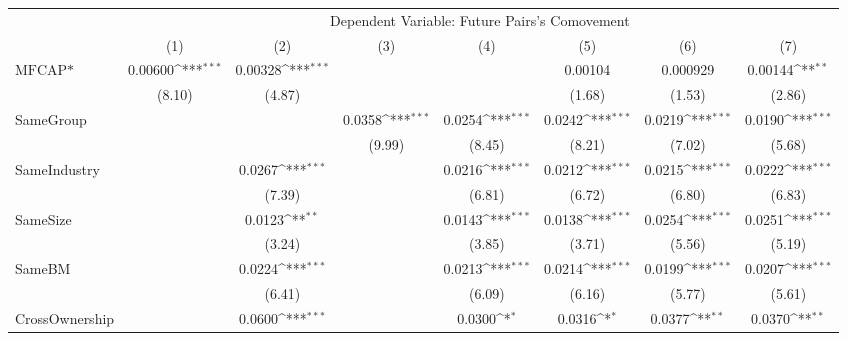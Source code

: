 {
\def\sym#1{\ifmmode^{#1}\else\(^{#1}\)\fi}
\begin{tabular}{l*{7}{c}}
\hline\hline
                &\multicolumn{7}{c}{Dependent Variable:  Future Pairs's Comovement}                                                                  \\\cmidrule(lr){2-8}
                &\multicolumn{1}{c}{(1)}         &\multicolumn{1}{c}{(2)}         &\multicolumn{1}{c}{(3)}         &\multicolumn{1}{c}{(4)}         &\multicolumn{1}{c}{(5)}         &\multicolumn{1}{c}{(6)}         &\multicolumn{1}{c}{(7)}         \\
\hline
$ \text{MFCAP*} $&  0.00600\sym{***}&  0.00328\sym{***}&                  &                  &  0.00104         & 0.000929         &  0.00144\sym{**} \\
                &   (8.10)         &   (4.87)         &                  &                  &   (1.68)         &   (1.53)         &   (2.86)         \\
[1em]
SameGroup       &                  &                  &   0.0358\sym{***}&   0.0254\sym{***}&   0.0242\sym{***}&   0.0219\sym{***}&   0.0190\sym{***}\\
                &                  &                  &   (9.99)         &   (8.45)         &   (8.21)         &   (7.02)         &   (5.68)         \\
[1em]
SameIndustry    &                  &   0.0267\sym{***}&                  &   0.0216\sym{***}&   0.0212\sym{***}&   0.0215\sym{***}&   0.0222\sym{***}\\
                &                  &   (7.39)         &                  &   (6.81)         &   (6.72)         &   (6.80)         &   (6.83)         \\
[1em]
SameSize        &                  &   0.0123\sym{**} &                  &   0.0143\sym{***}&   0.0138\sym{***}&   0.0254\sym{***}&   0.0251\sym{***}\\
                &                  &   (3.24)         &                  &   (3.85)         &   (3.71)         &   (5.56)         &   (5.19)         \\
[1em]
SameBM          &                  &   0.0224\sym{***}&                  &   0.0213\sym{***}&   0.0214\sym{***}&   0.0199\sym{***}&   0.0207\sym{***}\\
                &                  &   (6.41)         &                  &   (6.09)         &   (6.16)         &   (5.77)         &   (5.61)         \\
[1em]
CrossOwnership  &                  &   0.0600\sym{***}&                  &   0.0300\sym{*}  &   0.0316\sym{*}  &   0.0377\sym{**} &   0.0370\sym{**} \\

\end{tabular}}
